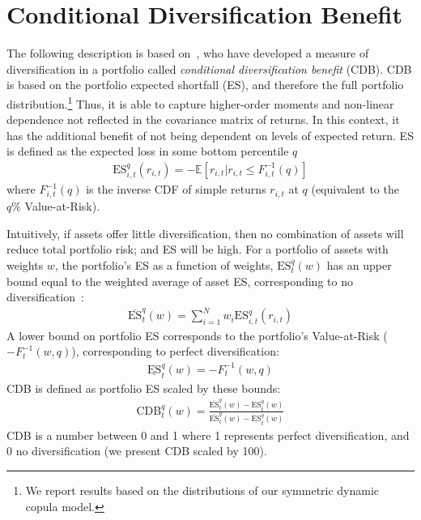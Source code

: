 
\section{Conditional Diversification Benefit} %
\label{sec:conditional_diversification_benefit}

The following description is based on~\textcite{ChristoffersenErrunzaJacobLanglois2012}, who have developed a measure of diversification in a portfolio called \emph{conditional diversification benefit} (CDB). CDB is based on the portfolio expected shortfall (ES), and therefore the full portfolio distribution.\footnote{We report results based on the distributions of our symmetric dynamic copula model.} Thus, it is able to capture higher-order moments and non-linear dependence not reflected in the covariance matrix of returns. In this context, it has the additional benefit of not being dependent on levels of expected return. ES is defined as the expected loss in some bottom percentile $q$
\begin{align}
    \text{ES}_{i,t}^q(r_{i,t}) = -\mathbb{E}[r_{i,t} | r_{i,t} \leq F_{i,t}^{-1}(q)]
\end{align}
where $F_{i,t}^{-1}(q)$ is the inverse CDF of simple returns $r_{i,t}$ at $q$ (equivalent to the $q\%$ Value-at-Risk). 

Intuitively, if assets offer little diversification, then no combination of assets will reduce total portfolio risk; and ES will be high. For a portfolio of assets with weights $w$, the portfolio's ES as a function of weights, $\text{ES}_t^q(w)$ has an upper bound equal to the weighted average of asset ES, corresponding to no diversification~\autocite{Artzner1999}:
\begin{align}
  \overline{\text{ES}}_t^q(w) = \sum_{i=1}^N w_i \text{ES}_{i,t}^q(r_{i,t})
\end{align}
A lower bound on portfolio ES corresponds to the portfolio's Value-at-Risk ($-F_{t}^{-1}(w, q)$), corresponding to perfect diversification:
\begin{align}
  \underline{\text{ES}}_t^q(w) = -F_{t}^{-1}(w, q)
\end{align}
CDB is defined as portfolio ES scaled by these bounds:
\begin{align}
  \text{CDB}_t^q(w) = \frac{\overline{\text{ES}}_t^q(w) - \text{ES}_t^q(w)}{\overline{\text{ES}}_t^q(w) - \underline{\text{ES}}_t^q(w)}
\end{align}
CDB is a number between 0 and 1 where 1 represents perfect diversification, and 0 no diversification (we present CDB scaled by 100).


